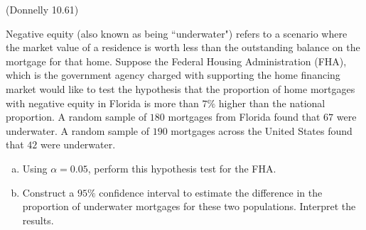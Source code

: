 \documentclass[12pt, letterpaper]{article}
\newcounter{exercise}
\theoremstyle{definition}
\begin{document}
\begin{exercise}  (Donnelly 10.61)

Negative equity (also known as being ``underwater") refers to a scenario where the market value of a residence is worth less than the outstanding balance on the mortgage for that home.  Suppose the Federal Housing Administration (FHA), which is the government agency charged with supporting the home financing market would like to test the hypothesis that the proportion of home mortgages with negative equity in Florida is more than $7\%$ higher than the national proportion.  A random sample of $180$ mortgages from Florida found that $67$ were underwater.  A random sample of $190$ mortgages across the United States found that $42$ were underwater.

\end{exercise}

\begin{enumerate}[(a)]

\item Using $\alpha = 0.05$, perform this hypothesis test for the FHA.

\vfill
\vfill
\vfill

\item Construct a $95\%$ confidence interval to estimate the difference in the proportion of underwater mortgages for these two populations.  Interpret the results.

\vfill
\vfill

\end{enumerate}
\end{document}
